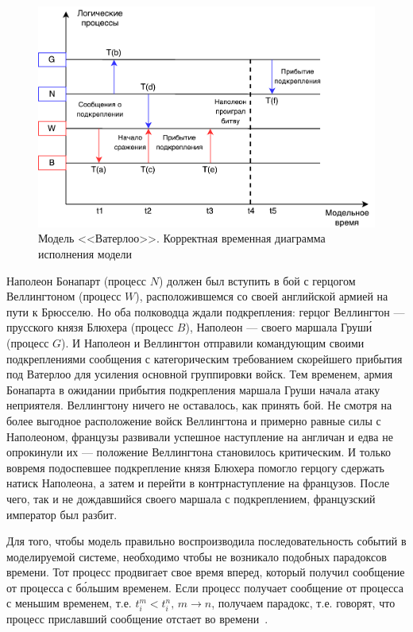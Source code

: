 \begin{figure}[!ht]
\centering
\includegraphics[scale=1]{images/waterloo.pdf}
\caption{Модель <<Ватерлоо>>. Корректная временная диаграмма исполнения модели}
\label{fig:Корректная временная диаграмма исполнения модели}
\end{figure}

Наполеон Бонапарт (процесс $N$) должен был вступить в бой с герцогом Веллингтоном (процесс $W$), расположившемся со своей английской армией на пути к Брюсселю. Но оба полководца ждали подкрепления: герцог Веллингтон --- прусского князя Блюхера (процесс $B$), Наполеон --- своего маршала Груш\'и (процесс $G$). И Наполеон и Веллингтон отправили командующим своими подкреплениями сообщения с категорическим требованием скорейшего прибытия под Ватерлоо для усиления основной группировки войск. Тем временем, армия Бонапарта в ожидании прибытия подкрепления маршала Груши начала атаку неприятеля. Веллингтону ничего не оставалось, как принять бой. Не смотря на более выгодное расположение войск Веллингтона и примерно равные силы с Наполеоном, французы развивали успешное наступление на англичан и едва не опрокинули их --- положение Веллингтона становилось критическим. И только вовремя подоспевшее подкрепление князя Блюхера помогло герцогу сдержать натиск Наполеона, а затем и перейти в контрнаступление на французов. После чего, так и не дождавшийся своего маршала с подкреплением, французский император был разбит.

Для того, чтобы модель правильно воспроизводила последовательность событий в моделируемой системе, необходимо чтобы не возникало подобных парадоксов времени.
Тот процесс продвигает свое время вперед, который получил сообщение от процесса с б\'ольшим временем. Если процесс получает сообщение от процесса с меньшим временем, т.е. $t_i^m<t_i^n, \, m \to n$, получаем парадокс, т.е. говорят, что процесс приславший сообщение  отстает во времени~\cite{okol}.

